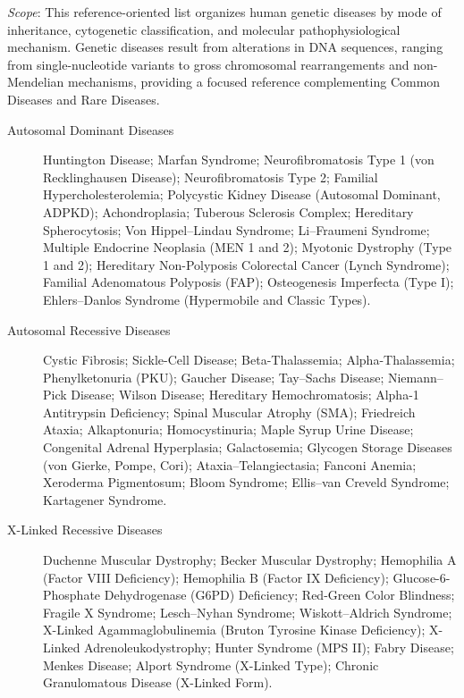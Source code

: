 \small
\noindent\textit{Scope}: This reference-oriented list organizes human genetic diseases by mode of inheritance, cytogenetic classification, and molecular pathophysiological mechanism. Genetic diseases result from alterations in DNA sequences, ranging from single-nucleotide variants to gross chromosomal rearrangements and non-Mendelian mechanisms, providing a focused reference complementing Common Diseases and Rare Diseases.

\medskip
\begin{description}
\item[Autosomal Dominant Diseases] Huntington Disease; Marfan Syndrome; Neurofibromatosis Type 1 (von Recklinghausen Disease); Neurofibromatosis Type 2; Familial Hypercholesterolemia; Polycystic Kidney Disease (Autosomal Dominant, ADPKD); Achondroplasia; Tuberous Sclerosis Complex; Hereditary Spherocytosis; Von Hippel–Lindau Syndrome; Li–Fraumeni Syndrome; Multiple Endocrine Neoplasia (MEN 1 and 2); Myotonic Dystrophy (Type 1 and 2); Hereditary Non-Polyposis Colorectal Cancer (Lynch Syndrome); Familial Adenomatous Polyposis (FAP); Osteogenesis Imperfecta (Type I); Ehlers–Danlos Syndrome (Hypermobile and Classic Types).

\item[Autosomal Recessive Diseases] Cystic Fibrosis; Sickle-Cell Disease; Beta-Thalassemia; Alpha-Thalassemia; Phenylketonuria (PKU); Gaucher Disease; Tay–Sachs Disease; Niemann–Pick Disease; Wilson Disease; Hereditary Hemochromatosis; Alpha-1 Antitrypsin Deficiency; Spinal Muscular Atrophy (SMA); Friedreich Ataxia; Alkaptonuria; Homocystinuria; Maple Syrup Urine Disease; Congenital Adrenal Hyperplasia; Galactosemia; Glycogen Storage Diseases (von Gierke, Pompe, Cori); Ataxia–Telangiectasia; Fanconi Anemia; Xeroderma Pigmentosum; Bloom Syndrome; Ellis–van Creveld Syndrome; Kartagener Syndrome.

\item[X-Linked Recessive Diseases] Duchenne Muscular Dystrophy; Becker Muscular Dystrophy; Hemophilia A (Factor VIII Deficiency); Hemophilia B (Factor IX Deficiency); Glucose-6-Phosphate Dehydrogenase (G6PD) Deficiency; Red-Green Color Blindness; Fragile X Syndrome; Lesch–Nyhan Syndrome; Wiskott–Aldrich Syndrome; X-Linked Agammaglobulinemia (Bruton Tyrosine Kinase Deficiency); X-Linked Adrenoleukodystrophy; Hunter Syndrome (MPS II); Fabry Disease; Menkes Disease; Alport Syndrome (X-Linked Type); Chronic Granulomatous Disease (X-Linked Form).


\end{description}
